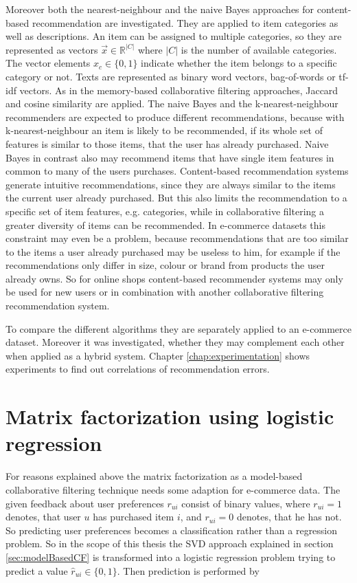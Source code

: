 \documentclass[10pt]{reportMaster}
\begin{document}
Moreover both the nearest-neighbour and the naive Bayes approaches for content-based recommendation are investigated.
They are applied to item categories as well as descriptions.
An item can be assigned to multiple categories, so they are represented as vectors $\vec{x} \in \mathds{R}^{|C|}$ where $|C|$ is the number of available categories.
The vector elements $x_c \in \{0,1\}$ indicate whether the item belongs to a specific category or not. 
Texts are represented as binary word vectors, bag-of-words or tf-idf vectors.
As in the memory-based collaborative filtering approaches, Jaccard and cosine similarity are applied.
The naive Bayes and the k-nearest-neighbour recommenders are expected to produce different recommendations, because with k-nearest-neighbour an item is likely to be recommended, if its whole set of features is similar to those items, that the user has already purchased.
Naive Bayes in contrast also may recommend items that have single item features in common to many of the users purchases.
Content-based recommendation systems generate intuitive recommendations, since they are always similar to the items the current user already purchased.
But this also limits the recommendation to a specific set of item features, e.g. categories, while in collaborative filtering a greater diversity of items can be recommended.
In e-commerce datasets this constraint may even be a problem, because recommendations that are too similar to the items a user already purchased may be useless to him, for example if the recommendations only differ in size, colour or brand from products the user already owns.
So for online shops content-based recommender systems may only be used for new users or in combination with another collaborative filtering recommendation system. %

To compare the different algorithms they are separately applied to an e-commerce dataset.
Moreover it was investigated, whether they may complement each other when applied as a hybrid system.
Chapter \ref{chap:experimentation} shows experiments to find out correlations of recommendation errors.


\section{Matrix factorization using logistic regression}
\label{sec:logRegSVD}

For reasons explained above the matrix factorization as a model-based collaborative filtering technique needs some adaption for e-commerce data.
The given feedback about user preferences $r_{ui}$ consist of binary values, where $r_{ui} = 1$ denotes, that user $u$ has purchased item $i$, and $r_{ui} = 0$ denotes, that he has not.
So predicting user preferences becomes a classification rather than a regression problem.
So in the scope of this thesis the SVD approach explained in section \ref{sec:modelBasedCF} is transformed into a logistic regression problem trying to predict a value $\hat{r}_{ui} \in \{0,1\}$.
Then prediction is performed by 
\end{document}
